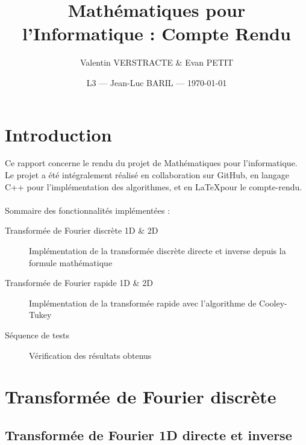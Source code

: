 \documentclass{article}
\title{Mathématiques pour l'Informatique : Compte Rendu} %
\author{Valentin VERSTRACTE \& Evan PETIT}
\date{L3 --- Jean-Luc BARIL --- \today} %
\begin{document}
\maketitle %

\bigskip
\bigskip
\renewcommand{\contentsname}{Table des matières}
\tableofcontents
\vspace{75pt}

% 

\section{Introduction} 

Ce rapport concerne le rendu du projet de Mathématiques pour l'informatique. Le projet a été intégralement réalisé en collaboration sur GitHub, en langage C++ pour l'implémentation des algorithmes, et en \LaTeX pour le compte-rendu.\\~\\
Sommaire des fonctionnalités implémentées :


\begin{description}
	\item [Transformée de Fourier discrète 1D \& 2D] Implémentation de la transformée discrète directe et inverse depuis la formule mathématique 
	\item [Transformée de Fourier rapide 1D \& 2D] Implémentation de la transformée rapide avec l'algorithme de Cooley-Tukey
	\item [Séquence de tests] Vérification des résultats obtenus 
\end{description}

\newpage

\section{Transformée de Fourier discrète}



\subsection{Transformée de Fourier 1D directe et inverse}
\end{document}
